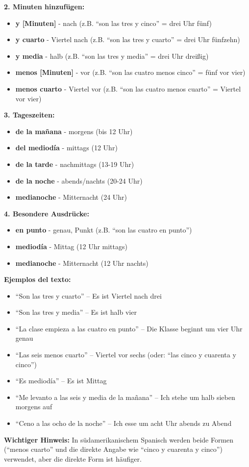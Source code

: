 \documentclass[12pt,a4paper]{article}
\begin{document}
\textbf{2. Minuten hinzufügen:}
\begin{itemize}[leftmargin=*]
    \item \textbf{y [Minuten]} - nach (z.B. \enquote{son las tres y cinco} = drei Uhr fünf)
    \item \textbf{y cuarto} - Viertel nach (z.B. \enquote{son las tres y cuarto} = drei Uhr fünfzehn)
    \item \textbf{y media} - halb (z.B. \enquote{son las tres y media} = drei Uhr dreißig)
    \item \textbf{menos [Minuten]} - vor (z.B. \enquote{son las cuatro menos cinco} = fünf vor vier)
    \item \textbf{menos cuarto} - Viertel vor (z.B. \enquote{son las cuatro menos cuarto} = Viertel vor vier)
\end{itemize}

\textbf{3. Tageszeiten:}
\begin{itemize}[leftmargin=*]
    \item \textbf{de la mañana} - morgens (bis 12 Uhr)
    \item \textbf{del mediodía} - mittags (12 Uhr)
    \item \textbf{de la tarde} - nachmittags (13-19 Uhr)
    \item \textbf{de la noche} - abends/nachts (20-24 Uhr)
    \item \textbf{medianoche} - Mitternacht (24 Uhr)
\end{itemize}

\textbf{4. Besondere Ausdrücke:}
\begin{itemize}[leftmargin=*]
    \item \textbf{en punto} - genau, Punkt (z.B. \enquote{son las cuatro en punto})
    \item \textbf{mediodía} - Mittag (12 Uhr mittags)
    \item \textbf{medianoche} - Mitternacht (12 Uhr nachts)
\end{itemize}

\textbf{Ejemplos del texto:}
\begin{itemize}[leftmargin=*]
    \item \enquote{Son las tres y cuarto} -- Es ist Viertel nach drei
    \item \enquote{Son las tres y media} -- Es ist halb vier
    \item \enquote{La clase empieza a las cuatro en punto} -- Die Klasse beginnt um vier Uhr genau
    \item \enquote{Las seis menos cuarto} -- Viertel vor sechs (oder: \enquote{las cinco y cuarenta y cinco})
    \item \enquote{Es mediodía} -- Es ist Mittag
    \item \enquote{Me levanto a las seis y media de la mañana} -- Ich stehe um halb sieben morgens auf
    \item \enquote{Ceno a las ocho de la noche} -- Ich esse um acht Uhr abends zu Abend
\end{itemize}

\textbf{Wichtiger Hinweis:} In südamerikanischem Spanisch werden beide Formen (\enquote{menos cuarto} und die direkte Angabe wie \enquote{cinco y cuarenta y cinco}) verwendet, aber die direkte Form ist häufiger.
\end{document}
